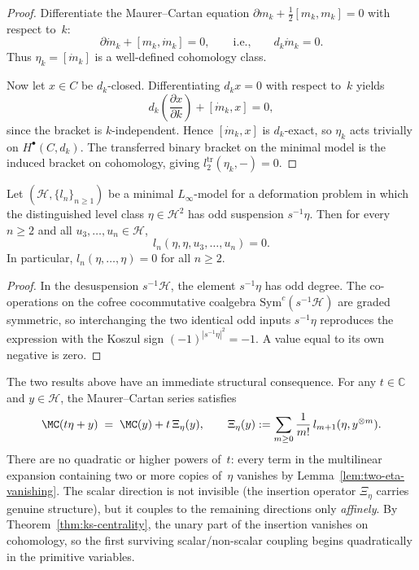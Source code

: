 \begin{proof}
Differentiate the Maurer--Cartan equation
$\partial m_k + \tfrac{1}{2}[m_k, m_k] = 0$ with respect to~$k$:
\[
\partial \dot{m}_k + [m_k, \dot{m}_k] = 0,
\qquad\text{i.e.,}\qquad
d_k \dot{m}_k = 0.
\]
Thus $\eta_k = [\dot{m}_k]$ is a well-defined cohomology class.

Now let $x \in C$ be $d_k$-closed. Differentiating $d_k x = 0$
with respect to~$k$ yields
\[
d_k\!\left(\frac{\partial x}{\partial k}\right) + [\dot{m}_k, x] = 0,
\]
since the bracket is $k$-independent. Hence $[\dot{m}_k, x]$ is
$d_k$-exact, so $\eta_k$ acts trivially on $H^\bullet(C, d_k)$.
The transferred binary bracket on the minimal model is the induced
bracket on cohomology, giving
$l_2^{\mathrm{tr}}(\eta_k, -) = 0$.
\end{proof}

\begin{lemma}
\label{lem:two-eta-vanishing}
Let $(\mathcal{H}, \{l_n\}_{n \geq 1})$ be a minimal $L_\infty$-model
for a deformation problem in which the distinguished level class
$\eta \in \mathcal{H}^2$ has odd suspension $s^{-1}\eta$. Then for
every $n \geq 2$ and all $u_3, \ldots, u_n \in \mathcal{H}$,
\[
l_n(\eta, \eta, u_3, \ldots, u_n) = 0.
\]
In particular, $l_n(\eta, \ldots, \eta) = 0$ for all $n \geq 2$.
\end{lemma}

\begin{proof}
In the desuspension $s^{-1}\mathcal{H}$, the element $s^{-1}\eta$ has
odd degree. The co-operations on the cofree cocommutative coalgebra
$\mathrm{Sym}^c(s^{-1}\mathcal{H})$ are graded symmetric, so
interchanging the two identical odd inputs $s^{-1}\eta$ reproduces the
expression with the Koszul sign $(-1)^{|s^{-1}\eta|^2} = -1$. A value
equal to its own negative is zero.
\end{proof}

\begin{remark}
\label{rem:scalar-direction-affine}
The two results above have an immediate structural consequence.
For any $t \in \mathbb{C}$ and $y \in \mathcal{H}$, the
Maurer--Cartan series satisfies
\[
\MC(t\eta + y)
\;=\;
\MC(y) + t\,\Xi_\eta(y),
\qquad
\Xi_\eta(y)
:= \sum_{m \geq 0} \frac{1}{m!}\, l_{m+1}(\eta, y^{\otimes m}).
\]
There are no quadratic or higher powers of~$t$: every term in the
multilinear expansion containing two or more copies of~$\eta$
vanishes by Lemma~\ref{lem:two-eta-vanishing}. The scalar direction
is not invisible (the insertion operator $\Xi_\eta$ carries
genuine structure), but it couples to the remaining directions only
\emph{affinely}. By Theorem~\ref{thm:ks-centrality}, the unary part
of the insertion vanishes on cohomology, so the first surviving
scalar/non-scalar coupling begins quadratically in the primitive
variables.
\end{remark}

